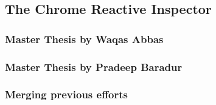 	\subsection{The Chrome Reactive Inspector}		
		\subsubsection{Master Thesis by Waqas Abbas}
		
		\subsubsection{Master Thesis by Pradeep Baradur}
		
		\subsubsection{Merging previous efforts}
		
